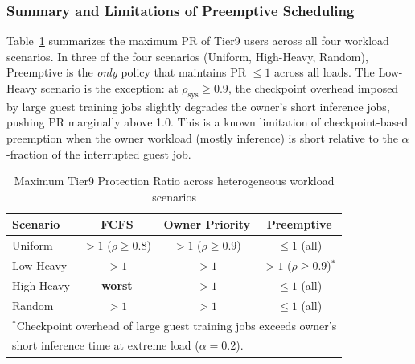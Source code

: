 
\subsubsection{Summary and Limitations of Preemptive Scheduling}

Table~\ref{tab:hetero_summary} summarizes the maximum PR of Tier9 users
across all four workload scenarios.
In three of the four scenarios (Uniform, High-Heavy, Random),
Preemptive is the \emph{only} policy that maintains PR $\leq 1$ across all loads.
The Low-Heavy scenario is the exception: at $\rho_\mathrm{sys} \geq 0.9$,
the checkpoint overhead imposed by large guest training jobs slightly
degrades the owner's short inference jobs, pushing PR marginally above 1.0.
This is a known limitation of checkpoint-based preemption when the
owner workload (mostly inference) is short relative to the
$\alpha$-fraction of the interrupted guest job.

%

\begin{table}[tb]
\centering
\caption{Maximum Tier9 Protection Ratio across heterogeneous workload scenarios}
\label{tab:hetero_summary}
\begin{tabular}{lccc}
\hline
Scenario   & FCFS           & Owner Priority          & Preemptive     \\ \hline
Uniform    & $>1$ ($\rho \geq 0.8$) & $>1$ ($\rho \geq 0.9$) & $\leq 1$ (all) \\
Low-Heavy  & $>1$           & $>1$                    & $>1$ ($\rho \geq 0.9$)$^{*}$ \\
High-Heavy & \textbf{worst} & $>1$                    & $\leq 1$ (all) \\
Random     & $>1$           & $>1$                    & $\leq 1$ (all) \\ \hline
\multicolumn{4}{l}{\footnotesize $^{*}$Checkpoint overhead of large guest training jobs exceeds owner's} \\
\multicolumn{4}{l}{\footnotesize \phantom{$^{*}$}short inference time at extreme load ($\alpha=0.2$).}
\end{tabular}
\end{table}


